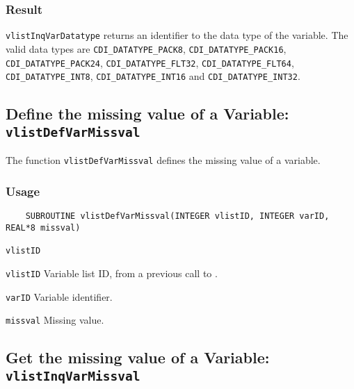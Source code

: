 \subsubsection*{Result}

{\texttt{vlistInqVarDatatype}} returns an identifier to the data type of the variable.
The valid {\CDI} data types are {\texttt{CDI\_DATATYPE\_PACK8}}, {\texttt{CDI\_DATATYPE\_PACK16}}, {\texttt{CDI\_DATATYPE\_PACK24}},
{\texttt{CDI\_DATATYPE\_FLT32}}, {\texttt{CDI\_DATATYPE\_FLT64}}, {\texttt{CDI\_DATATYPE\_INT8}}, {\texttt{CDI\_DATATYPE\_INT16}} and
{\texttt{CDI\_DATATYPE\_INT32}}.



\subsection{Define the missing value of a Variable: \texttt{vlistDefVarMissval}}
\label{vlistDefVarMissval}

The function {\texttt{vlistDefVarMissval}} defines the missing value of a variable.

\subsubsection*{Usage}

\begin{verbatim}
    SUBROUTINE vlistDefVarMissval(INTEGER vlistID, INTEGER varID, REAL*8 missval)
\end{verbatim}

\hspace*{4mm}\begin{minipage}[]{15cm}
\begin{deflist}{\texttt{vlistID}\ }
\item[\texttt{vlistID}]
Variable list ID, from a previous call to {}.
\item[\texttt{varID}]
Variable identifier.
\item[\texttt{missval}]
Missing value.

\end{deflist}
\end{minipage}


\subsection{Get the missing value of a Variable: \texttt{vlistInqVarMissval}}
\label{vlistInqVarMissval}


